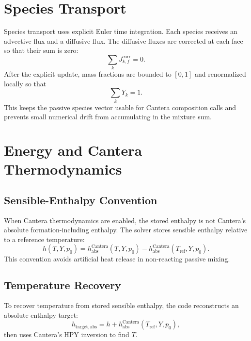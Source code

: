 \documentclass[11pt]{article}
\begin{document}
\section{Species Transport}

Species transport uses explicit Euler time integration.  Each species receives
an advective flux and a diffusive flux.  The diffusive fluxes are corrected at
each face so that their sum is zero:
\begin{equation}
  \sum_k J_{k,f}^{\mathrm{corr}} = 0.
\end{equation}
After the explicit update, mass fractions are bounded to \([0,1]\) and
renormalized locally so that
\begin{equation}
  \sum_k Y_k = 1.
\end{equation}
This keeps the passive species vector usable for Cantera composition calls and
prevents small numerical drift from accumulating in the mixture sum.

\section{Energy and Cantera Thermodynamics}

\subsection{Sensible-Enthalpy Convention}

When Cantera thermodynamics are enabled, the stored enthalpy is not Cantera's
absolute formation-including enthalpy.  The solver stores sensible enthalpy
relative to a reference temperature:
\begin{equation}
  h(T,Y,p_0)
  =
  h_{\mathrm{abs}}^{\mathrm{Cantera}}(T,Y,p_0)
  -
  h_{\mathrm{abs}}^{\mathrm{Cantera}}(T_{\mathrm{ref}},Y,p_0).
\end{equation}
This convention avoids artificial heat release in non-reacting passive mixing.

\subsection{Temperature Recovery}

To recover temperature from stored sensible enthalpy, the code reconstructs an
absolute enthalpy target:
\begin{equation}
  h_{\mathrm{target,abs}}
  =
  h
  +
  h_{\mathrm{abs}}^{\mathrm{Cantera}}(T_{\mathrm{ref}},Y,p_0),
\end{equation}
then uses Cantera's HPY inversion to find \(T\).
\end{document}
